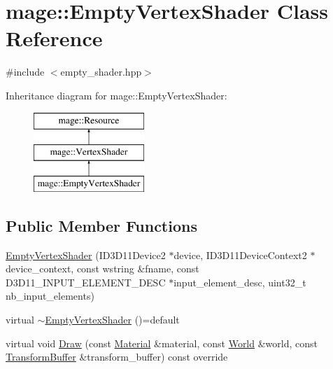 \hypertarget{classmage_1_1_empty_vertex_shader}{}\section{mage\+:\+:Empty\+Vertex\+Shader Class Reference}
\label{classmage_1_1_empty_vertex_shader}


{\ttfamily \#include $<$empty\+\_\+shader.\+hpp$>$}

Inheritance diagram for mage\+:\+:Empty\+Vertex\+Shader\+:\begin{figure}[H]
\begin{center}
\leavevmode
\includegraphics[height=3.000000cm]{classmage_1_1_empty_vertex_shader}
\end{center}
\end{figure}
\subsection*{Public Member Functions}
\begin{DoxyCompactItemize}
\item 
\hyperlink{classmage_1_1_empty_vertex_shader_a28fae401cf46242513144278dcd7f051}{Empty\+Vertex\+Shader} (I\+D3\+D11\+Device2 $\ast$device, I\+D3\+D11\+Device\+Context2 $\ast$device\+\_\+context, const wstring \&fname, const D3\+D11\+\_\+\+I\+N\+P\+U\+T\+\_\+\+E\+L\+E\+M\+E\+N\+T\+\_\+\+D\+E\+SC $\ast$input\+\_\+element\+\_\+desc, uint32\+\_\+t nb\+\_\+input\+\_\+elements)
\item 
virtual \hyperlink{classmage_1_1_empty_vertex_shader_a321ef00a2087030b81713e989ab02306}{$\sim$\+Empty\+Vertex\+Shader} ()=default
\item 
virtual void \hyperlink{classmage_1_1_empty_vertex_shader_aaecd66ff2aa90221accbde8e5bf1f239}{Draw} (const \hyperlink{structmage_1_1_material}{Material} \&material, const \hyperlink{classmage_1_1_world}{World} \&world, const \hyperlink{structmage_1_1_transform_buffer}{Transform\+Buffer} \&transform\+\_\+buffer) const override
\end{DoxyCompactItemize}
